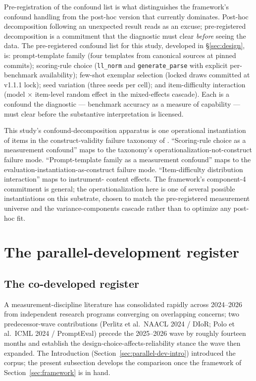\documentclass[11pt]{article}
\begin{document}
Pre-registration of the confound list is what distinguishes the
framework's confound handling from the post-hoc version that
currently dominates. Post-hoc decomposition following an unexpected
result reads as an excuse; pre-registered decomposition is a
commitment that the diagnostic must clear \emph{before} seeing the
data. The pre-registered confound list for this study, developed
in §\ref{sec:design}, is: prompt-template family (four templates
from canonical sources at pinned commits); scoring-rule choice
(\texttt{ll\_norm} and \texttt{generate\_parse} with explicit
per-benchmark availability); few-shot exemplar selection (locked
draws committed at v1.1.1 lock); seed variation (three seeds per
cell); and item-difficulty interaction (model $\times$ item-level
random effect in the mixed-effects cascade). Each is a confound
the diagnostic --- benchmark accuracy as a measure of capability
--- must clear before the substantive interpretation is licensed.

This study's confound-decomposition apparatus is one operational
instantiation of items in the construct-validity failure taxonomy
of \citet{bean2025measuring}. ``Scoring-rule choice as a measurement
confound'' maps to the taxonomy's operationalization-not-construct
failure mode. ``Prompt-template family as a measurement confound''
maps to the evaluation-instantiation-as-construct failure mode.
``Item-difficulty distribution interaction'' maps to instrument-
content effects. The framework's component-4 commitment is general;
the operationalization here is one of several possible instantiations
on this substrate, chosen to match the pre-registered measurement
universe and the variance-components cascade rather than to optimize
any post-hoc fit.


\section{The parallel-development register}
\label{sec:parallel-dev-related-work}

\subsection{The co-developed register}
\label{sec:codev-register}

A measurement-discipline literature has consolidated rapidly across 2024--2026 from independent research programs converging on overlapping concerns; two predecessor-wave contributions (Perlitz et al.\ NAACL 2024 / DIoR; Polo et al.\ ICML 2024 / PromptEval) precede the 2025--2026 wave by roughly fourteen months and establish the design-choice-affects-reliability stance the wave then expanded. The Introduction (Section~\ref{sec:parallel-dev-intro}) introduced the corpus; the present subsection develops the comparison once the framework of Section~\ref{sec:framework} is in hand.
\end{document}
